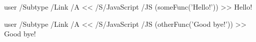 \documentclass[a4paper,10pt]{article}
\begin{document}
   \leavevmode
   \pdfstartlink user {
      /Subtype /Link
      /A <<
        /S/JavaScript
        /JS (someFunc('Hello!'))
      >>
   }Hello!\pdfendlink

   \leavevmode
   \pdfstartlink user {
      /Subtype /Link
      /A <<
        /S/JavaScript
        /JS (otherFunc('Good bye!'))
      >>
   }Good bye!\pdfendlink
\end{document}

